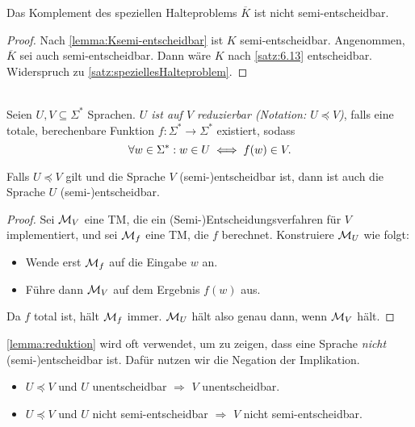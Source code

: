 \begin{Korollar}\label{kor:6.11}
    Das Komplement des speziellen Halteproblems $\overline{K}$
    ist nicht semi-{\linebreak}entscheidbar.
\end{Korollar}
\begin{proof}
Nach \autoref{lemma:Ksemi-entscheidbar} ist $K$ semi-entscheidbar. 
Angenommen, $\overline{K}$ sei auch semi-entscheidbar.
Dann wäre $K$ nach \autoref{satz:6.13} entscheidbar.
Widerspruch zu \autoref{satz:speziellesHalteproblem}.
\end{proof}


\begin{Def}[Reduktion]\label{def:reduktion}\ \\
  Seien $U, V \subseteq \Sigma^*$ Sprachen.
  \emph{$U$ ist auf $V$ reduzierbar (Notation: $U \preceq V$)}, falls eine totale, berechenbare Funktion
  $f:\Sigma^* \to \Sigma^*$ existiert, sodass
  \[
    \forall w \in \Sigma^*:w \in U \iff f(w) \in V. \qedhere
  \]

\end{Def}
\begin{lemma}\label{lemma:reduktion}
  Falls $U \preceq V$ gilt und die Sprache $V$ \mbox{(semi-)entscheidbar} ist, dann ist auch die Sprache $U$
  \mbox{(semi-)entscheidbar}.
\end{lemma}
\begin{proof}
  Sei $\mathcal{M}_V$ eine \ac{TM}, die ein (Semi-)Entscheidungsverfahren für $V$ implementiert,
  und sei $\mathcal{M}_f$ eine \ac{TM}, die $f$ berechnet.
  Konstruiere $\mathcal{M}_U$ wie folgt:
  \begin{itemize}
  \item Wende erst $\mathcal{M}_f$ auf die Eingabe $w$ an.
  \item Führe dann $\mathcal{M}_V$ auf dem Ergebnis $f(w)$ aus.
  \end{itemize}
  Da $f$ total ist, hält $\mathcal{M}_f$ immer.
  $\mathcal{M}_U$ hält also genau dann, wenn $\mathcal{M}_V$ hält.
\end{proof}

\begin{Bemerkung} \autoref{lemma:reduktion} wird oft verwendet, um zu zeigen, dass eine Sprache \emph{nicht} \mbox{(semi-)entscheidbar} ist.
Dafür nutzen wir die Negation der Implikation.
\begin{itemize}
 \item $U \preceq V$ und $U$ unentscheidbar $\Rightarrow$ $V$ unentscheidbar.
 \item $U \preceq V$ und $U$ nicht semi-entscheidbar $\Rightarrow$ $V$ nicht semi-entscheidbar.
 \qedhere
\end{itemize}
\end{Bemerkung}

